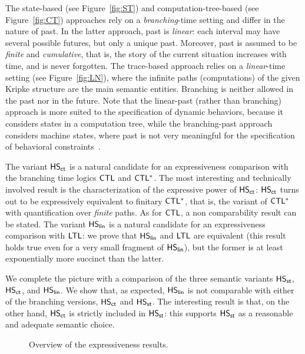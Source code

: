 The state-based (see Figure~\ref{fig:ST}) and computation-tree-based (see Figure~\ref{fig:CT}) approaches rely on a \emph{branching}-time setting and differ in the nature of past. In the latter approach, past is \emph{linear}: each interval may have several possible futures, but only a unique past. Moreover, past is assumed to be \emph{finite} 
and \emph{cumulative}, that is, the story of the current situation increases with time, and is never forgotten. 
%
The trace-based approach relies on a \emph{linear}-time setting (see Figure~\ref{fig:LN}), where the infinite paths (computations) of the given Kripke structure are the main semantic entities. Branching is neither allowed in the past nor in the future.
%
Note that the linear-past (rather than branching) approach is more suited to the specification  of dynamic behaviors, because it considers states in a computation tree, while the branching-past approach considers machine states, where past is not very meaningful for the specification of behavioral constraints~\cite{LS95}.

The variant $\text{\sffamily HS}_{\mathsf{ct}}$ is a natural candidate for an expressiveness comparison with the branching time logics  $\text{\sffamily CTL}$ and $\text{\sffamily CTL$^{*}$}$. The most interesting and technically involved result is the characterization of the expressive power of $\text{\sffamily HS}_{\mathsf{ct}}$: $\text{\sffamily HS}_{\mathsf{ct}}$ turns out to be expressively equivalent to finitary $\text{\sffamily CTL$^{*}$}$, that is, the variant of $\text{\sffamily CTL$^{*}$}$ with quantification over \emph{finite} paths. As for $\text{\sffamily CTL}$, a non comparability result can be stated.
%
The variant $\text{\sffamily HS}_{\mathsf{lin}}$ is a natural candidate for an expressiveness comparison with $\text{\sffamily LTL}$: 
we prove that $\text{\sffamily HS}_{\mathsf{lin}}$ and $\text{\sffamily LTL}$ are equivalent (this result holds true even for a very small fragment of $\text{\sffamily HS}_{\mathsf{lin}}$), but the former is at least exponentially more succinct than the latter. 

We complete the picture with a comparison of the three semantic variants $\text{\sffamily HS}_{\mathsf{st}}$, $\text{\sffamily HS}_{\mathsf{ct}}$, and $\text{\sffamily HS}_{\mathsf{lin}}$. We show that, as expected, $\text{\sffamily HS}_{\mathsf{lin}}$ is not comparable with either of the branching versions, $\text{\sffamily HS}_{\mathsf{ct}}$ and $\text{\sffamily HS}_{\mathsf{st}}$. The interesting result is that, on the other hand, $\text{\sffamily HS}_{\mathsf{ct}}$ is strictly included in $\text{\sffamily HS}_{\mathsf{st}}$: this supports $\text{\sffamily HS}_{\mathsf{st}}$ as a reasonable and adequate semantic choice.

\begin{figure}[b]
\centering
\vspace*{-0.6cm}
\caption{Overview of the expressiveness results.}\label{results}
\end{figure}


